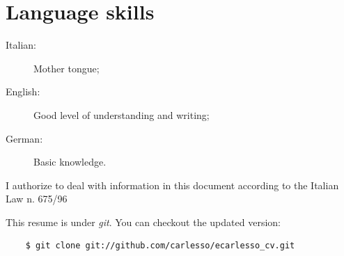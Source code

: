 \documentclass[pdftex, a4paper, 11pt]{article}
\begin{document}
\section*{Language skills}
\begin{description}
\item[Italian:] Mother tongue;
\item[English:] Good level of understanding and writing;
\item[German:] Basic knowledge.
\end{description}


\vfill

I authorize to deal with information in this document according to the Italian Law n. 675/96

\vspace{1cm}

\footnotesize {This resume is under {\em git}. You can checkout the updated version:}
\begin{verbatim}
    $ git clone git://github.com/carlesso/ecarlesso_cv.git
\end{verbatim}
\end{document}
